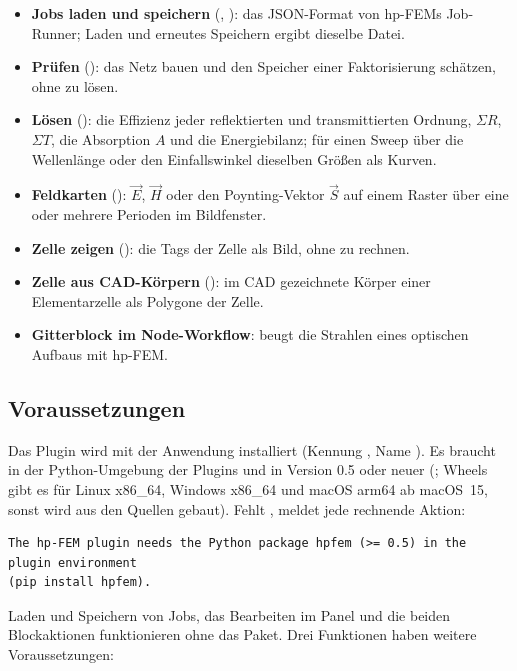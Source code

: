 \begin{itemize}
  \item \textbf{Jobs laden und speichern} (, ): das JSON-Format von
    hp-FEMs Job-Runner; Laden und erneutes Speichern ergibt dieselbe Datei.
  \item \textbf{Prüfen} (): das Netz bauen und den Speicher einer Faktorisierung
    schätzen, ohne zu lösen.
  \item \textbf{Lösen} (): die Effizienz jeder reflektierten und transmittierten
    Ordnung, $\Sigma R$, $\Sigma T$, die Absorption $A$ und die Energiebilanz; für einen Sweep über
    die Wellenlänge oder den Einfallswinkel dieselben Größen als Kurven.
  \item \textbf{Feldkarten} (): $\vec E$, $\vec H$ oder den Poynting-Vektor
    $\vec S$ auf einem Raster über eine oder mehrere Perioden im Bildfenster.
  \item \textbf{Zelle zeigen} (): die Tags der Zelle als Bild, ohne zu rechnen.
  \item \textbf{Zelle aus CAD-Körpern} (): im CAD gezeichnete Körper
    einer Elementarzelle als Polygone der Zelle.
  \item \textbf{Gitterblock im Node-Workflow}:  beugt die Strahlen eines
    optischen Aufbaus mit hp-FEM.
\end{itemize}

\subsection{Voraussetzungen}\label{sec:hp-voraussetzungen}

Das Plugin wird mit der Anwendung installiert (Kennung , Name ). Es
braucht in der Python-Umgebung der Plugins  und  in Version 0.5 oder neuer
(; Wheels gibt es für Linux x86\_64, Windows x86\_64 und macOS arm64 ab
macOS~15, sonst wird aus den Quellen gebaut). Fehlt , meldet jede rechnende Aktion:

\begin{lstlisting}
The hp-FEM plugin needs the Python package hpfem (>= 0.5) in the plugin environment
(pip install hpfem).
\end{lstlisting}

Laden und Speichern von Jobs, das Bearbeiten im Panel und die beiden Blockaktionen
funktionieren ohne das Paket. Drei Funktionen haben weitere Voraussetzungen:

